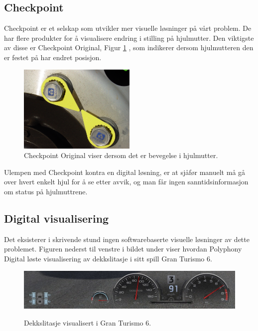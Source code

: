 \subsection{Checkpoint}
Checkpoint er et selskap som utvikler mer visuelle løsninger på vårt problem.
De har flere produkter for å visualisere endring i stilling på hjulmutter. Den 
viktigste av disse er Checkpoint Original, Figur \ref{fig:checkpoint} \cite{checkpoint1}, 
som indikerer dersom hjulmutteren den er festet på har endret posisjon. 
	\newline
	\begin{figure}[H]
		\centering
		\includegraphics[width=0.50\textwidth]{images/checkpoint-original.jpg}
		\caption{Checkpoint Original viser dersom det er bevegelse i hjulmutter.}
		\label{fig:checkpoint}
	\end{figure}
Ulempen med Checkpoint kontra en digital løsning, er at sjåfør manuelt må gå over 
hvert enkelt hjul for å se etter avvik, og man får ingen sanntidsinformasjon om 
status på hjulmuttrene.

\subsection{Digital visualisering}
Det eksisterer i skrivende stund ingen softwarebaserte visuelle løsninger av dette 
problemet. Figuren nederst til venstre i bildet under viser hvordan  
Polyphony Digital løste visualisering av 
dekkslitasje i sitt spill Gran Turismo 6. \cite{dekkslitasje-GT6} 
	\newline
	\begin{figure}[H]
		\centering
		\includegraphics[width=1.00\textwidth]{images/gran-turismo-6-screenshot.jpg}
		\label{fig:GT6}
		\caption{Dekkslitasje visualisert i Gran Turismo 6.}
	\end{figure}
